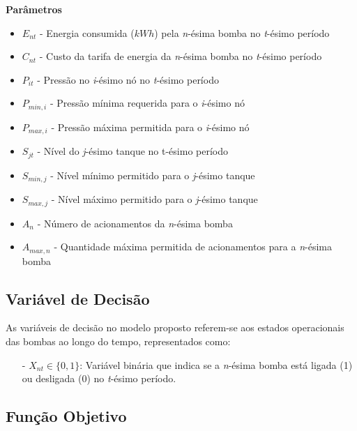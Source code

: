 \documentclass[12pt,a4paper,oneside,linenumbers=off,latinmodern=off,timesnews=off,english,spanish]{rctart-class/rctart}
\begin{document}
\textbf{Parâmetros}  
\begin{itemize}
    \item \(E_{nt}\) - Energia consumida (\(kWh\)) pela \textit{n}-ésima bomba no \textit{t}-ésimo período
    
    \item \(C_{nt}\) - Custo da tarifa de energia da \textit{n}-ésima bomba no \textit{t}-ésimo período
    
    \item \(P_{it}\) - Pressão no \textit{i}-ésimo nó no \textit{t}-ésimo período
    
    \item \(P_{min,i}\) - Pressão mínima requerida para o \textit{i}-ésimo nó
    
    \item \(P_{max,i}\) - Pressão máxima permitida para o \textit{i}-ésimo nó
    
    \item \(S_{jt}\) - Nível do \textit{j}-ésimo tanque no t-ésimo período
    
    \item \(S_{min,j}\) - Nível mínimo permitido para o \textit{j}-ésimo tanque
    
    \item \(S_{max,j}\) - Nível máximo permitido para o \textit{j}-ésimo tanque
    
    \item \(A_n\) - Número de acionamentos da \textit{n}-ésima bomba
    
    \item \(A_{max,n}\) - Quantidade máxima permitida de acionamentos para a \textit{n}-ésima bomba
\end{itemize}


\subsection{Variável de Decisão}

As variáveis de decisão no modelo proposto referem-se aos estados operacionais das bombas ao longo do tempo, representados como:

\begin{itemize}
\item[-] \(X_{nt} \in \{0, 1\}\): Variável binária que indica se a \textit{n}-ésima bomba está ligada (1) ou desligada (0) no \textit{t}-ésimo período.
\end{itemize}

\subsection{Função Objetivo}
\end{document}

